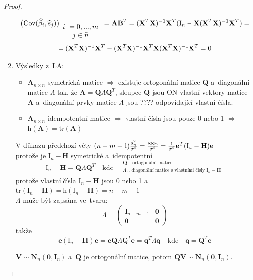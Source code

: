 \begin{proof}
\begin{enumerate}
 $$
 \big(\text{Cov}(\widehat{\beta}_i, \widehat{e}_j) \big)_{ \begin{array}{c}
 i~ = 0,..., m \\
 j  \in\widehat{n}
 \end{array} } = \textbf{AB}^T
 = (\textbf{X}^T \textbf{X})^{-1} \textbf{X}^T (\text{I}_n - \textbf{X} (\textbf{X}^T \textbf{X})^{-1} \textbf{X}^T) = 
 $$
 $$
 = (\textbf{X}^T \textbf{X})^{-1} \textbf{X}^T - (\textbf{X}^T \textbf{X})^{-1} \textbf{X}^T \textbf{X} (\textbf{X}^T \textbf{X})^{-1} \textbf{X}^T = 0
 $$
\item Výsledky z~LA: \\
\begin{itemize}
\item $\textbf{A}_{n \times n}$ symetrická matice $\Rightarrow$ existuje ortogonální matice \textbf{Q} a~diagonální matice $\Lambda$ tak, že $\textbf{A} = \textbf{Q} \Lambda \textbf{Q}^T$, sloupce \textbf{Q} jsou ON vlastní vektory matice \textbf{A} a~diagonální prvky matice $\Lambda$ jsou ???? odpovídající vlastní čísla.
\item $\textbf{A}_{n \times n}$ idempotentní matice $\Rightarrow$ vlastní čísla jsou pouze 0 nebo 1 $\Rightarrow$$ \text{h}(\textbf{A}) = \text{tr}(\textbf{A}) $
\end{itemize}
V důkazu předchozí věty $(n - m -1) \frac{s_n^2}{\sigma^2} = \frac{\mathrm{SSE}}{\sigma^2} = \frac{1}{\sigma^2} \textbf{e}^T (\text{I}_n - \textbf{H}) \textbf{e}$ \\
protože je $\text{I}_n - \textbf{H}$ symetrické a~idempotentní
 $$
 \text{I}_n - \textbf{H} = \textbf{Q} \Lambda \textbf{Q}^T  \quad \text{kde} \quad
 \begin{array}{c}
 _{\textbf{Q}... \text{ ortogonální matice}} \\
^{\Lambda... \text{ diagonální matice s~vlastními čísly } \text{I}_n - \textbf{H}}
 \end{array}
 $$
protože vlastní čísla $\text{I}_n - \textbf{H}$ jsou 0 nebo 1 a~$\text{tr}(\text{I}_n - \textbf{H}) = \text{h}(\text{I}_n - \textbf{H}) = n - m - 1$ \\
 $\Lambda$ může být zapsána ve~tvaru:
 $$
 \Lambda = 
 \left(\begin{array}{cc}
 \textbf{I}_{n-m-1} & \textbf{0}  \\
 \textbf{0} & \textbf{0}
 \end{array} \right)
 $$
takže
 $$
 \textbf{e} (\text{I}_n - \textbf{H}) \textbf{e} = \textbf{e} \textbf{Q} \Lambda \textbf{Q}^T \textbf{e} = \textbf{q}^T \Lambda \textbf{q} \quad \text{kde} \quad \textbf{q} = \textbf{Q}^T \textbf{e}
 $$
\begin{theorem}
	 $\textbf{V} \sim \textbf{N}_n (\textbf{0}, \textbf{I}_n)$ a~$\textbf{Q}$ je ortogonální matice, potom $\textbf{QV} \sim \textbf{N}_n (\textbf{0}, \textbf{I}_n).$

\end{theorem}
\end{enumerate}
\end{proof}
